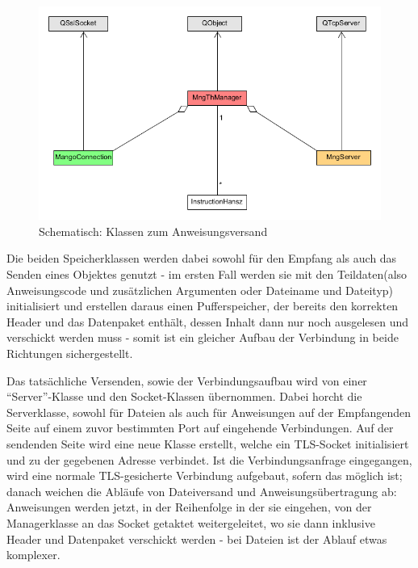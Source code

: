 \begin{figure}
\includegraphics[scale=.4]{classDiagInstr}
\caption{Schematisch: Klassen zum Anweisungsversand}
\label{inst_d}
\end{figure}

Die beiden Speicherklassen werden dabei sowohl für den Empfang als auch das Senden eines Objektes genutzt - im ersten Fall werden sie mit den Teildaten(also Anweisungscode und zusätzlichen Argumenten oder Dateiname und Dateityp) initialisiert und erstellen daraus einen Pufferspeicher, der bereits den korrekten Header und das Datenpaket enthält, dessen Inhalt dann nur noch ausgelesen und verschickt werden muss - somit ist ein gleicher Aufbau der Verbindung in beide Richtungen sichergestellt.\par
Das tatsächliche Versenden, sowie der Verbindungsaufbau wird von einer "`Server"'-Klasse und den Socket-Klassen übernommen.
Dabei horcht die Serverklasse, sowohl für Dateien als auch für Anweisungen auf der Empfangenden Seite auf einem zuvor bestimmten Port auf eingehende Verbindungen.
Auf der sendenden Seite wird eine neue Klasse erstellt, welche ein TLS-Socket initialisiert und zu der gegebenen Adresse verbindet.
Ist die Verbindungsanfrage eingegangen, wird eine normale TLS-gesicherte Verbindung aufgebaut, sofern das möglich ist; danach weichen die Abläufe von Dateiversand und Anweisungsübertragung ab: Anweisungen werden jetzt, in der Reihenfolge in der sie eingehen, von der Managerklasse an das Socket getaktet weitergeleitet, wo sie dann inklusive Header und Datenpaket verschickt werden - bei Dateien ist der Ablauf etwas komplexer.\par

